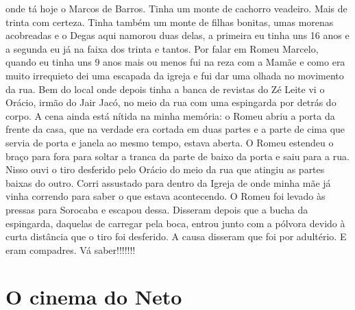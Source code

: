 \documentclass[12pt,brazil,]{book}
\begin{document}
onde tá hoje o Marcos de Barros. Tinha um monte de cachorro veadeiro.
Mais de trinta com certeza. Tinha também um monte de filhas bonitas,
umas morenas acobreadas e o Degas aqui namorou duas delas, a primeira eu
tinha uns 16 anos e a segunda eu já na faixa dos trinta e tantos. Por
falar em Romeu Marcelo, quando eu tinha uns 9 anos mais ou menos fui na
reza com a Mamãe e como era muito irrequieto dei uma escapada da igreja
e fui dar uma olhada no movimento da rua. Bem do local onde depois tinha
a banca de revistas do Zé Leite vi o Orácio, irmão do Jair Jacó, no meio
da rua com uma espingarda por detrás do corpo. A cena ainda está nítida
na minha memória: o Romeu abriu a porta da frente da casa, que na
verdade era cortada em duas partes e a parte de cima que servia de porta
e janela ao mesmo tempo, estava aberta. O Romeu estendeu o braço para
fora para soltar a tranca da parte de baixo da porta e saiu para a rua.
Nisso ouvi o tiro desferido pelo Orácio do meio da rua que atingiu as
partes baixas do outro. Corri assustado para dentro da Igreja de onde
minha mãe já vinha correndo para saber o que estava acontecendo. O Romeu
foi levado às pressas para Sorocaba e escapou dessa. Disseram depois que
a bucha da espingarda, daquelas de carregar pela boca, entrou junto com
a pólvora devido à curta distância que o tiro foi desferido. A causa
disseram que foi por adultério. E eram compadres. Vá saber!!!!!!!

\section{O cinema do Neto}\label{o-cinema-do-neto}
\end{document}
